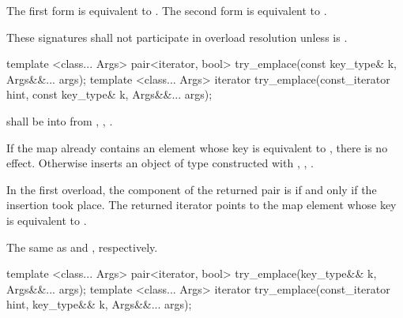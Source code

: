 \begin{itemdescr}
\pnum
\effects
The first form is equivalent to 
. The second form is
equivalent to .

\pnum
\remarks
These signatures shall not participate in overload resolution
unless  is
.
\end{itemdescr}

%
\begin{itemdecl}
template <class... Args> pair<iterator, bool> try_emplace(const key_type& k, Args&&... args);
template <class... Args> iterator try_emplace(const_iterator hint, const key_type& k, Args&&... args);
\end{itemdecl}

\begin{itemdescr}
\pnum
\requires
{} shall be  into 
from , ,
.

\pnum
\effects
If the map already contains an element
whose key is equivalent to ,
there is no effect.
Otherwise inserts an object of type 
constructed with , ,
.

\pnum
\returns
In the first overload,
the  component of the returned pair is 
if and only if the insertion took place.
The returned iterator points to the map element
whose key is equivalent to .

\pnum
\complexity
The same as  and ,
respectively.
\end{itemdescr}

%
\begin{itemdecl}
template <class... Args> pair<iterator, bool> try_emplace(key_type&& k, Args&&... args);
template <class... Args> iterator try_emplace(const_iterator hint, key_type&& k, Args&&... args);
\end{itemdecl}

